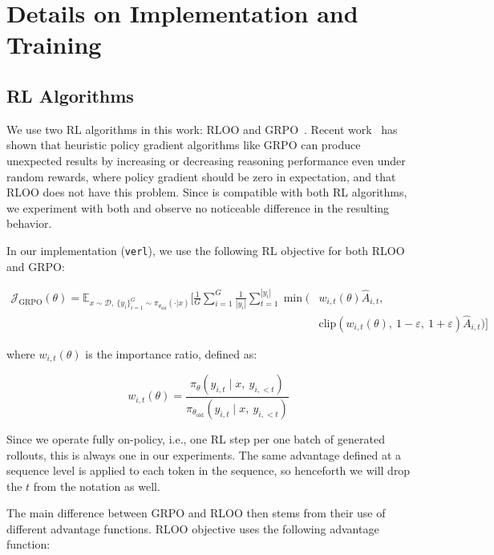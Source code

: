 \newpage

\section{Details on Implementation and Training}

\subsection{RL Algorithms} 

We use two RL algorithms in this work: RLOO\citep{ahmadian-etal-2024-back, Kool2019Buy4R} and GRPO~\citep{shao2024deepseekmathpushinglimitsmathematical}. Recent work~\citep{Oertell2024Heuristics} has shown that heuristic policy gradient algorithms like GRPO can produce unexpected results by increasing or decreasing reasoning performance even under random rewards, where policy gradient should be zero in expectation, and that RLOO does not have this problem. Since \algo{} is compatible with both RL algorithms, we experiment with both and observe no noticeable difference in the resulting behavior.

In our implementation (\texttt{verl}), we use the following RL objective for both RLOO and GRPO:

\begin{align*}
\mathcal{J}_{\text{GRPO}}(\theta) 
= \mathbb{E}_{x \sim \mathcal{D},\ \{y_i\}_{i=1}^G \sim \pi_{\theta_{\text{old}}}(\cdot|x)} 
\Bigg[ 
    \frac{1}{G} \sum_{i=1}^G \frac{1}{|y_i|} \sum_{t=1}^{|y_i|} 
    \min \Big( & w_{i,t}(\theta) \hat{A}_{i,t}, \\
    & \text{clip}(w_{i,t}(\theta),\ 1 - \varepsilon,\ 1 + \varepsilon) \hat{A}_{i,t} 
    \Big) 
\Bigg]
\end{align*}

where $w_{i, t}(\theta)$ is the importance ratio, defined as:

$$w_{i,t}(\theta) = \frac{
    \pi_\theta(y_{i,t} \mid x,\ y_{i,<t})
}{
    \pi_{\theta_{\text{old}}}(y_{i,t} \mid x,\ y_{i,<t})
}$$

Since we operate fully on-policy, i.e., one RL step per one batch of generated rollouts, this is always one in our experiments. The same advantage defined at a sequence level is applied to each token in the sequence, so henceforth we will drop the $t$ from the notation as well.

The main difference between GRPO and RLOO then stems from their use of different advantage functions. RLOO objective uses the following advantage function:

